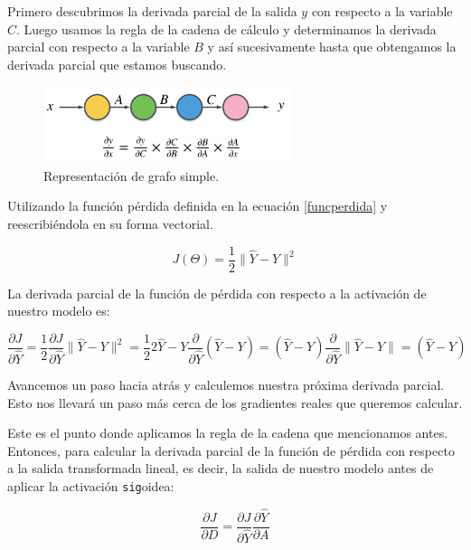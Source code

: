 \documentclass[a4paper,12pt]{article}
\begin{document}
Primero descubrimos la derivada parcial de la salida $y$ con respecto a la variable $C$. Luego usamos la regla de la cadena de cálculo y determinamos la derivada parcial con respecto a la variable $B$ y así sucesivamente hasta que obtengamos la derivada parcial que estamos buscando.

\begin{figure}[H]
	\begin{center}				
	\includegraphics[width=0.65\textwidth]{025.png}
  	\caption{Representación de grafo simple.}
  	\label{fig:func}
  	\end{center}
\end{figure}

Utilizando la función pérdida definida en la ecuación \ref{funcperdida} y reescribiéndola en su forma vectorial.

\begin{equation}
J(\Theta)=\frac{1}{2} \|\hat{Y}-Y\|^2
\end{equation}

La derivada parcial de la función de pérdida con respecto a la activación de nuestro modelo es:

\begin{equation}
\frac{\partial J}{\partial \hat{Y}}
=\frac{1}{2} \frac{\partial J}{\partial \hat{Y}} \|\hat{Y}-Y\|^2 = \frac{1}{2} 2 \hat{Y} - Y \frac{\partial}{\partial \hat{Y}} (\hat{Y}-Y) = (\hat{Y}-Y) \frac{\partial}{\partial \hat{Y}} \|\hat{Y}-Y\| = (\hat{Y} - Y)
\label{dj/dy}
\end{equation}

Avancemos un paso hacia atrás y calculemos nuestra próxima derivada parcial. Esto nos llevará un paso más cerca de los gradientes reales que queremos calcular.

Este es el punto donde aplicamos la regla de la cadena que mencionamos antes. Entonces, para calcular la derivada parcial de la función de pérdida con respecto a la salida transformada lineal, es decir, la salida de nuestro modelo antes de aplicar la activación \texttt{sig}oidea:

\begin{equation}
\frac{\partial J}{\partial D} = \frac{\partial J}{\partial \hat{Y}} \frac{\partial \hat{Y}}{\partial A}
\label{dJdD}
\end{equation}
\end{document}
